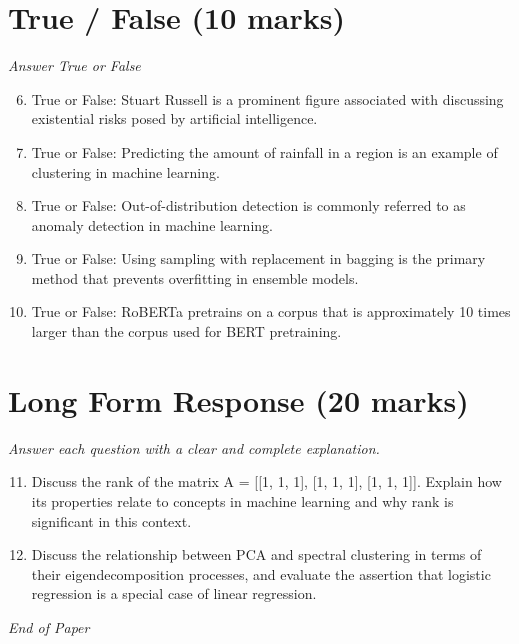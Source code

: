 \documentclass[12pt]{article}
\begin{document}
\section*{True / False (10 marks)}
\textit{Answer True or False}
\begin{enumerate}[label=\arabic*.]
\setcounter{enumi}{5}
\item True or False: Stuart Russell is a prominent figure associated with discussing existential risks posed by artificial intelligence.
\item True or False: Predicting the amount of rainfall in a region is an example of clustering in machine learning.
\item True or False: Out-of-distribution detection is commonly referred to as anomaly detection in machine learning.
\item True or False: Using sampling with replacement in bagging is the primary method that prevents overfitting in ensemble models.
\item True or False: RoBERTa pretrains on a corpus that is approximately 10 times larger than the corpus used for BERT pretraining.
\end{enumerate}

\section*{Long Form Response (20 marks)}
\textit{Answer each question with a clear and complete explanation.}
\begin{enumerate}[label=\arabic*.]
\setcounter{enumi}{10}
\item Discuss the rank of the matrix A = [[1, 1, 1], [1, 1, 1], [1, 1, 1]]. Explain how its properties relate to concepts in machine learning and why rank is significant in this context.
\item Discuss the relationship between PCA and spectral clustering in terms of their eigendecomposition processes, and evaluate the assertion that logistic regression is a special case of linear regression.
\end{enumerate}

\vfill
\noindent\textit{End of Paper}
\end{document}
